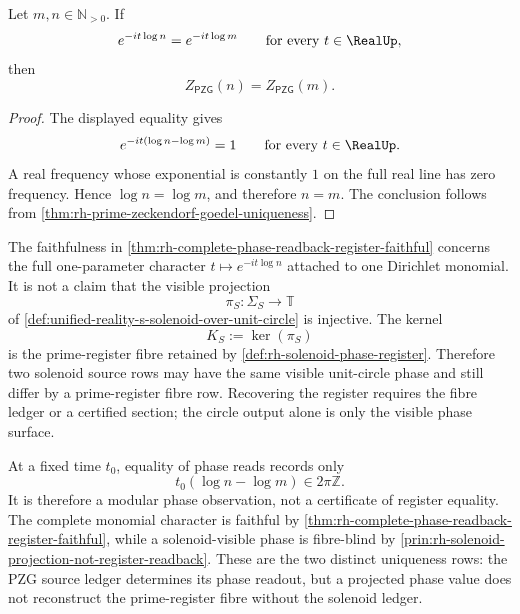 \begin{theorem}
\label{thm:rh-complete-phase-readback-register-faithful}
Let $m,n\in\mathbb N_{>0}$. If
$$
e^{-it\log n}=e^{-it\log m}
\qquad
\text{for every }t\in\RealUp,
$$
then
$$
Z_{\mathsf{PZG}}(n)=Z_{\mathsf{PZG}}(m).
$$
\end{theorem}

\begin{proof}
The displayed equality gives
$$
e^{-it(\log n-\log m)}=1
\qquad
\text{for every }t\in\RealUp.
$$
A real frequency whose exponential is constantly $1$ on the full real
line has zero frequency. Hence $\log n=\log m$, and therefore $n=m$.
The conclusion follows from
\autoref{thm:rh-prime-zeckendorf-goedel-uniqueness}.
\end{proof}

\begin{principle}
\label{prin:rh-solenoid-projection-not-register-readback}
The faithfulness in
\autoref{thm:rh-complete-phase-readback-register-faithful} concerns the
full one-parameter character
$t\mapsto e^{-it\log n}$ attached to one Dirichlet monomial. It is not a
claim that the visible projection
$$
\pi_S:\Sigma_S\to\mathbb T
$$
of \autoref{def:unified-reality-s-solenoid-over-unit-circle} is
injective. The kernel
$$
K_S:=\ker(\pi_S)
$$
is the prime-register fibre retained by
\autoref{def:rh-solenoid-phase-register}. Therefore two solenoid source
rows may have the same visible unit-circle phase and still differ by a
prime-register fibre row. Recovering the register requires the fibre
ledger or a certified section; the circle output alone is only the
visible phase surface.
\end{principle}

\begin{principle}
\label{prin:rh-instantaneous-phase-not-register-certificate}
At a fixed time $t_0$, equality of phase reads records only
$$
t_0(\log n-\log m)\in2\pi\mathbb Z.
$$
It is therefore a modular phase observation, not a certificate of
register equality. The complete monomial character is faithful by
\autoref{thm:rh-complete-phase-readback-register-faithful}, while a
solenoid-visible phase is fibre-blind by
\autoref{prin:rh-solenoid-projection-not-register-readback}. These are
the two distinct uniqueness rows: the PZG source ledger determines its
phase readout, but a projected phase value does not reconstruct the
prime-register fibre without the solenoid ledger.
\end{principle}

